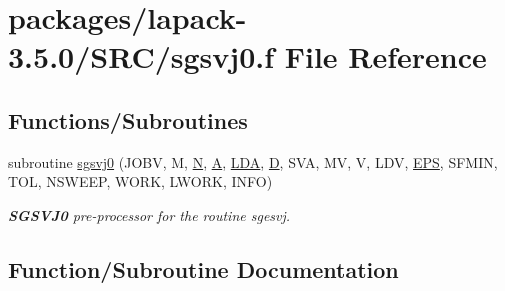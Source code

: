 \hypertarget{sgsvj0_8f}{}\section{packages/lapack-\/3.5.0/\+S\+R\+C/sgsvj0.f File Reference}
\label{sgsvj0_8f}
\subsection*{Functions/\+Subroutines}
\begin{DoxyCompactItemize}
\item 
subroutine \hyperlink{sgsvj0_8f_a7eefc2e25efd6bba438cc1b957f186ea}{sgsvj0} (J\+O\+B\+V, M, \hyperlink{polmisc_8c_a0240ac851181b84ac374872dc5434ee4}{N}, \hyperlink{classA}{A}, \hyperlink{example__user_8c_ae946da542ce0db94dced19b2ecefd1aa}{L\+D\+A}, \hyperlink{odrpack_8h_a7dae6ea403d00f3687f24a874e67d139}{D}, S\+V\+A, M\+V, V, L\+D\+V, \hyperlink{tukey_8c_a6ebf6899d6c1c8b7b9d09be872c05aae}{E\+P\+S}, S\+F\+M\+I\+N, T\+O\+L, N\+S\+W\+E\+E\+P, W\+O\+R\+K, L\+W\+O\+R\+K, I\+N\+F\+O)
\begin{DoxyCompactList}\small\item\em {\bfseries S\+G\+S\+V\+J0} pre-\/processor for the routine sgesvj. \end{DoxyCompactList}\end{DoxyCompactItemize}


\subsection{Function/\+Subroutine Documentation}
\hypertarget{sgsvj0_8f_a7eefc2e25efd6bba438cc1b957f186ea}{}
